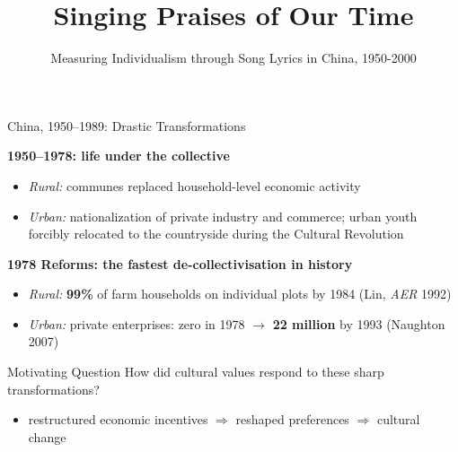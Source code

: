 \documentclass[aspectratio=169]{beamer}
\title{Singing Praises of Our Time}
\subtitle{Measuring Individualism through Song Lyrics in China, 1950-2000}
\author{}
\date{}
\institute{}
\begin{document}
\maketitle

\begin{frame}{China, 1950--1989: Drastic Transformations}

  \textbf{1950--1978: life under the collective}
  \begin{itemize}
    \item \textit{Rural:} communes replaced household-level economic activity
    \item \textit{Urban:} nationalization of private industry and commerce; urban youth forcibly relocated to the countryside during the Cultural Revolution
  \end{itemize}

  \vspace{0.5em}
  \textbf{1978 Reforms: the fastest de-collectivisation in history}
  \begin{itemize}
    \item \textit{Rural:} \textbf{99\%} of farm households on individual plots by 1984 (Lin, \textit{AER} 1992)
    \item \textit{Urban:} private enterprises: zero in 1978 $\to$ \textbf{22 million} by 1993 (Naughton 2007)
  \end{itemize}

  \vspace{0.5em}
  \begin{block}{Motivating Question}
    How did cultural values respond to these sharp transformations?
    \begin{itemize}
      \item restructured economic incentives $\Rightarrow$ reshaped preferences $\Rightarrow$ cultural change
    \end{itemize}
  \end{block}
\end{frame}
\end{document}
